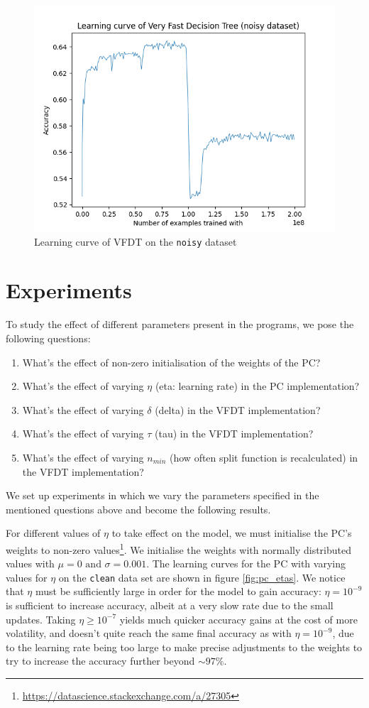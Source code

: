 \documentclass[12pt]{article}
\begin{document}
\begin{figure}
	\centering
	\includegraphics[width=.8\linewidth]{../plots/vfdt_noise}
	\caption{Learning curve of VFDT on the \texttt{noisy} dataset}
	\label{fig:vfdt_noise}
\end{figure}

\section{Experiments}\label{sec:experiments}
To study the effect of different parameters present in the programs, we pose the following questions:
\begin{enumerate}
	\item What's the effect of non-zero initialisation of the weights of the PC?
	\item What's the effect of varying $\eta$ (eta: learning rate) in the PC implementation?
	\item What's the effect of varying $\delta$ (delta) in the VFDT implementation?
	\item What's the effect of varying $\tau$ (tau) in the VFDT implementation?
	\item What's the effect of varying $n_{min}$ (how often split function is recalculated) in the VFDT implementation?
\end{enumerate}

We set up experiments in which we vary the parameters specified in the mentioned questions above and become the following results.

For different values of $\eta$ to take effect on the model, we must initialise the PC's weights to non-zero values\footnote{\url{https://datascience.stackexchange.com/a/27305}}. We initialise the weights with normally distributed values with $\mu = 0 \text{ and } \sigma = 0.001$. The learning curves for the PC with varying values for $\eta$ on the \texttt{clean} data set are shown in figure \ref{fig:pc_etas}. We notice that $\eta$ must be sufficiently large in order for the model to gain accuracy: $\eta = 10^{-9}$ is sufficient to increase accuracy, albeit at a very slow rate due to the small updates. Taking $\eta \geq 10^{-7}$ yields much quicker accuracy gains at the cost of more volatility, and	 doesn't quite reach the same final accuracy as with $\eta = 10^{-9}$, due to the learning rate being too large to make precise adjustments to the weights to try to increase the accuracy further beyond $\sim 97\%$.
\end{document}
